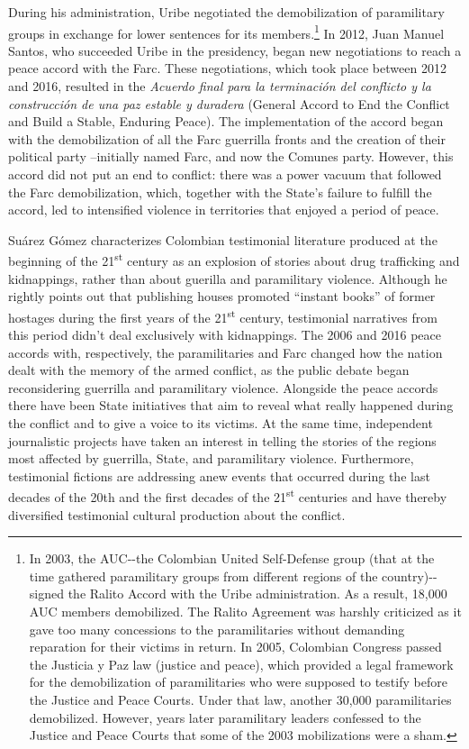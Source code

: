 \documentclass[
  11pt,
,
onecolumn,
openany
]{book}
\begin{document}
During his administration, Uribe negotiated the demobilization of paramilitary
groups in exchange for lower sentences for its members.\footnote{In 2003, the
  AUC-\/-the Colombian United Self-Defense group (that at the time gathered
  paramilitary groups from different regions of the country)-\/- signed the
  Ralito Accord with the Uribe administration. As a result, 18,000 AUC members
  demobilized. The Ralito Agreement was harshly criticized as it gave too many
  concessions to the paramilitaries without demanding reparation for their
  victims in return. In 2005, Colombian Congress passed the Justicia y Paz law
  (justice and peace), which provided a legal framework for the demobilization
  of paramilitaries who were supposed to testify before the Justice and Peace
  Courts. Under that law, another 30,000 paramilitaries demobilized. However,
  years later paramilitary leaders confessed to the Justice and Peace Courts
  that some of the 2003 mobilizations were a sham.} In 2012, Juan Manuel
Santos, who succeeded Uribe in the presidency, began new negotiations to reach
a peace accord with the Farc. These negotiations, which took place between
2012 and 2016, resulted in the \emph{Acuerdo final para la terminación del
conflicto y la construcción de una paz estable y duradera} (General Accord to
End the Conflict and Build a Stable, Enduring Peace). The implementation of
the accord began with the demobilization of all the Farc guerrilla fronts and
the creation of their political party --initially named Farc, and now the
Comunes party. However, this accord did not put an end to conflict: there was
a power vacuum that followed the Farc demobilization, which, together with the
State's failure to fulfill the accord, led to intensified violence in
territories that enjoyed a period of peace.

Suárez Gómez characterizes Colombian testimonial literature produced at the
beginning of the 21\textsuperscript{st} century as an explosion of stories
about drug trafficking and kidnappings, rather than about guerilla and
paramilitary violence. Although he rightly points out that publishing houses
promoted ``instant books'' of former hostages during the first years of the
21\textsuperscript{st} century, testimonial narratives from this period didn't
deal exclusively with kidnappings. The 2006 and 2016 peace accords with,
respectively, the paramilitaries and Farc changed how the nation dealt with
the memory of the armed conflict, as the public debate began reconsidering
guerrilla and paramilitary violence. Alongside the peace accords there have
been State initiatives that aim to reveal what really happened during the
conflict and to give a voice to its victims. At the same time, independent
journalistic projects have taken an interest in telling the stories of the
regions most affected by guerrilla, State, and paramilitary violence.
Furthermore, testimonial fictions are addressing anew events that occurred
during the last decades of the 20th and the first decades of the
21\textsuperscript{st} centuries and have thereby diversified testimonial
cultural production about the conflict.
\end{document}
